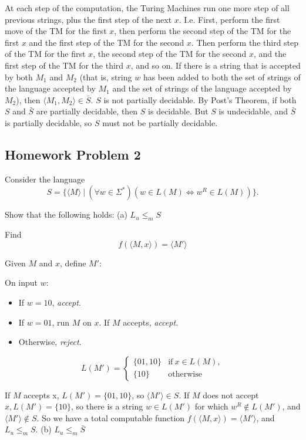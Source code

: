 \documentclass{article}
\begin{document}
At each step of the computation, the Turing Machines run one more step of all
previous strings, plus the first step of the next $x$. I.e. First, perform the
first move of the TM for the first $x$, then perform the second step of the TM
for the first $x$ and the first step of the TM for the second $x$. Then perform
the third step of the TM for the first $x$, the second step of the TM for the
second $x$, and the first step of the TM for the third $x$, and so on.
If there is a string that is accepted by both $M_1$ and $M_2$ (that is, string $w$
has been added to both the set of strings of the language accepted by $M_1$ and
the set of strings of the language accepted by $M_2$), then $\langle M_1, M_2 \rangle \in \bar{S}$.
\newline
\newline
$S$ is not partially decidable. By Post's Theorem, if both $S$ and $\bar{S}$ are
partially decidable, then $S$ is decidable. But $S$ is undecidable, and $\bar{S}$
is partially decidable, so $S$ must not be partially decidable.

\subsection*{Homework Problem 2}
Consider the language 
$$S = \{\langle M \rangle~|~(\forall w \in \Sigma^*)(w \in L(M) \iff w^R \in L(M))\}.$$

Show that the following holds:
\newline
\newline
(a) $L_u \leq_m S$

Find $$f(\langle M, x \rangle) = \langle M' \rangle$$

Given $M$ and $x$, define $M'$:

On input $w$:
\begin{itemize}
	\itemsep 0em
	\item If $w = 10$, \textit{accept}.
	\item If $w = 01$, run $M$ on $x$. If $M$ accepts, \textit{accept}. 
	\item Otherwise, \textit{reject}.
\end{itemize}

$$
L(M') = \begin{cases}
	\{01, 10\} & \text{if}\ x \in L(M), \\
	\{10\} & \text{otherwise}
\end{cases}
$$

If $M$ accepts x, $L(M') = \{01, 10\}$, so $\langle M' \rangle \in S$. If $M$
does not accept $x, L(M') = \{10\}$, so there is a string $w \in L(M')$ for which
$w^R \notin L(M')$, and $\langle M' \rangle \notin S$. So we have a total
computable function $f(\langle M, x \rangle) = \langle M' \rangle$, and $L_u \leq_m S$.
\newline
\newline
(b) $L_u \leq_m \bar{S}$
\end{document}
